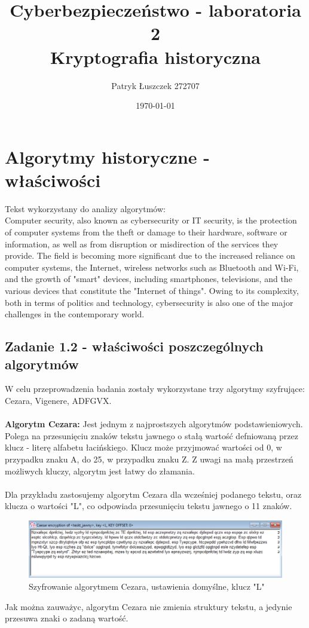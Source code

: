 \documentclass{article}
\title{%
  Cyberbezpieczeństwo - laboratoria 2 \\
  \large Kryptografia historyczna}
\author{Patryk Łuszczek 272707}
\date{\today}
\begin{document}
\maketitle
\newpage
\tableofcontents
\newpage

\section{Algorytmy historyczne - właściwości}
Tekst wykorzystany do analizy algorytmów:\\
Computer security, also known as cybersecurity or IT security, is the protection of computer systems from the theft or damage to their hardware, software or information, as well as from disruption or misdirection of the services they provide. The field is becoming more significant due to the increased reliance on computer systems, the Internet, wireless networks such as Bluetooth and Wi-Fi, and the growth of "smart" devices, including smartphones, televisions, and the various devices that constitute the "Internet of things". Owing to its complexity, both in terms of politics and technology, cybersecurity is also one of the major challenges in the contemporary world.

\subsection*{Zadanie 1.2 - właściwości poszczególnych algorytmów}
W celu przeprowadzenia badania zostały wykorzystane trzy algorytmy szyfrujące: Cezara, Vigenere, ADFGVX.\\\\

\textbf{Algorytm Cezara:}
Jest jednym z najprostszych algorytmów podstawieniowych. Polega na przesunięciu znaków tekstu jawnego o stałą wartość defniowaną przez klucz - literę alfabetu łacińskiego.
Klucz może przyjmować wartości od 0, w przypadku znaku A, do 25, w przypadku znaku Z. Z uwagi na małą przestrzeń możliwych kluczy, algorytm jest łatwy do złamania.\\\\
Dla przykładu zastosujemy algorytm Cezara dla wcześniej podanego tekstu, oraz klucza o wartości "L", co odpowiada przesunięciu tekstu jawnego o 11 znaków.
\begin{figure}[H]
    \centering
    \includegraphics[width=\textwidth]{cezar_szyfr.png}
    \caption{Szyfrowanie algorytmem Cezara, ustawienia domyślne, klucz "L"}
\end{figure}
Jak można zauważyc, algorytm Cezara nie zmienia struktury tekstu, a jedynie przesuwa znaki o zadaną wartość.\\\\
\end{document}
